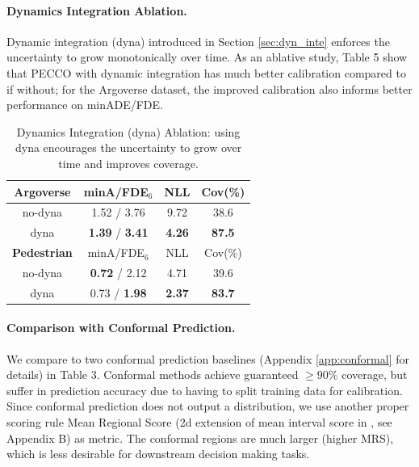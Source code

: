 \paragraph{Dynamics Integration Ablation.}
Dynamic integration (dyna) introduced in Section \ref{sec:dyn_inte} enforces the uncertainty to grow monotonically over time. As an ablative study, Table 5 show that PECCO with  dynamic integration has much better calibration compared to if without; for the Argoverse dataset, the improved calibration also informs better performance on minADE/FDE.

\begin{table}
\centering 
\begin{tabular}{ c|c c c  } 
\toprule
\textbf{Argoverse} & minA/FDE$_6$ & NLL & Cov(\%) \\ 
\midrule
no-dyna & 1.52 / 3.76 & 9.72  & 38.6 \\
dyna & \textbf{1.39} / \textbf{3.41} & \textbf{4.26}  &  \textbf{87.5} \\
\toprule
\textbf{Pedestrian} & minA/FDE$_6$ & NLL & Cov(\%) \\ 
\midrule
no-dyna & \textbf{0.72} / 2.12 & 4.71 & 39.6  \\
dyna & 0.73 / \textbf{1.98} & \textbf{2.37}  & \textbf{83.7} \\
\bottomrule
\end{tabular}
\caption{Dynamics Integration (dyna) Ablation: using dyna encourages the uncertainty to grow over time and improves coverage.}
\label{tab:dynamics-ablation}
\end{table}


\paragraph{Comparison with Conformal Prediction.}
We compare to two conformal prediction baselines \cite{2021conformal} (Appendix \ref{app:conformal} for details) in Table 3. Conformal methods achieve guaranteed $\geq 90\%$ coverage, but suffer in prediction accuracy due to having to split training data for calibration. Since conformal prediction does not output a distribution, we use another proper scoring rule Mean Regional Score (2d extension of mean interval score in \cite{properscoring}, see Appendix B) as metric. The conformal regions are much larger (higher MRS), which is less desirable for downstream decision making tasks.
